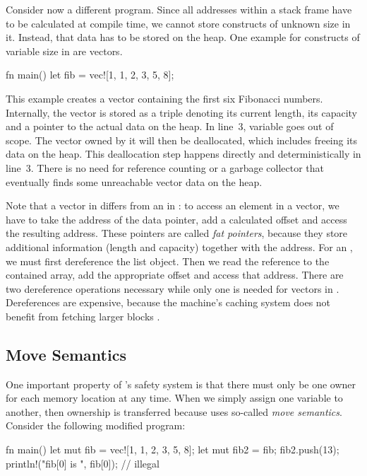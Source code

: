 Consider now a different program.
Since all addresses within a stack frame have to be calculated at compile time, we cannot store constructs of unknown size in it.
Instead, that data has to be stored on the heap.
One example for constructs of variable size in \rust are vectors.

\begin{rustcode}
fn main() {
	let fib = vec![1, 1, 2, 3, 5, 8];
}
\end{rustcode}

This example creates a vector containing the first six Fibonacci numbers.
Internally, the vector is stored as a triple denoting its current length, its capacity and a pointer to the actual data on the heap.
In line~3, variable  goes out of scope.
The vector owned by it will then be deallocated, which includes freeing its data on the heap.
This deallocation step happens directly and deterministically in line~3.
There is no need for reference counting or a garbage collector that eventually finds some unreachable vector data on the heap.

Note that a vector in \rust differs from an  in \java:
to access an element in a vector, we have to take the address of the data pointer, add a calculated offset and access the resulting address.
These pointers are called \emph{fat pointers}, because they store additional information (length and capacity) together with the address.
For an , we must first dereference the list object.
Then we read the reference to the contained array, add the appropriate offset and access that address.
There are two dereference operations necessary while only one is needed for vectors in \rust.
Dereferences are expensive, because the machine's caching system does not benefit from fetching larger blocks \cite{kahn1998mechanism}.


\subsection{Move Semantics}

One important property of \rust's safety system is that there must only be one owner for each memory location at any time.
When we simply assign one variable to another, then ownership is transferred because \rust uses so-called \emph{move semantics}.
Consider the following modified program:

\begin{rustcode}
fn main() {
	let mut fib = vec![1, 1, 2, 3, 5, 8];
	let mut fib2 = fib;
	fib2.push(13);
	println!("fib[0] is {}", fib[0]); // illegal
}
\end{rustcode}

